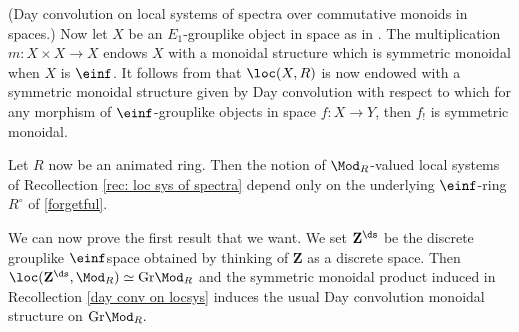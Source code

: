 \documentclass[10pt,reqno]{amsart}
\numberwithin{equation}{section}
\newcommand{\ZZ}{\mathbf{Z}}
\newcommand{\Gr}{\mathrm{Gr}}
\begin{document}
\begin{recollection}(Day convolution on local systems of spectra over commutative monoids in spaces.)\label{day conv on locsys}
Now let $X$ be an $E_1$-grouplike object in space as in \cite[Definition 5.2.6]{HA}. The multiplication $m\colon X\times X\to X$ endows $X$ with a monoidal structure which is symmetric monoidal when $X$ is $\einf$. It follows from \cite[Corollary 6.13]{AndoBlumbergGepner2018ParametrizedThom} that $\loc(X,R)$ is now endowed with a symmetric monoidal structure given by Day convolution \cite[\S~2.2.6]{HA} with respect to which for any morphism of $\einf$-grouplike objects in space $f\colon X\to Y$, then $f_!$ is symmetric monoidal. 
\end{recollection}



\begin{remark}\label{remark: animated ring loc sys}
    Let $R$ now be an animated ring. Then the notion of $\Mod_R$-valued local systems of Recollection \ref{rec: loc sys of spectra} depend only on the underlying $\einf$-ring $R^\circ$ of \ref{forgetful}. 
\end{remark}

\begin{notation}
    We can now prove the first result that we want. We set $\ZZ^\ds$ be the discrete grouplike $\einf $space obtained by thinking of $\ZZ$ as a discrete space. 
    Then $\loc(\ZZ^\ds,\Mod_R)\simeq \Gr\Mod_R$ and the symmetric monoidal product induced in Recollection \ref{day conv on locsys} induces the usual Day convolution monoidal structure on $\Gr\Mod_R.$
\end{notation}
\end{document}
